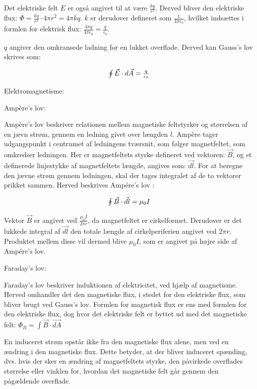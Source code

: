 Det elektriske felt $E$ er også angivet til at være $\frac{kq}{r^2}$. Derved bliver den elektriske flux: $\Phi = \frac{kq}{r^2} \cdot 4 \pi r^2 = 4 \pi k q$. $k$ er derudover defineret som $\frac{1}{4 \pi \epsilon_0}$, hvilket indsættes i formlen for elektrisk flux: $\frac{4 \pi q}{4 \pi \epsilon_0} = \frac{q}{\epsilon_0}$.

$q$ angiver den omkransede ladning for en lukket overflade. Derved kan Gauss's lov skrives som\cite[Kap. 21]{fysikbog}:

\begin{equation} \label{gauss}
\centerline{$\oint \vec{E} \cdot d \vec{A} = \frac{q}{\epsilon_0}$} 
\end{equation}


Elektromagnetisme:

Ampère's lov:

Ampère's lov beskriver relationen mellem magnetiske feltstyrker og størrelsen af en jævn strøm, gennem en ledning givet over længden $l$. Ampère tager udgangspunkt i centrumet af ledningens tværsnit, som følger magnetfeltet, som omkredser ledningen. Her er magnetfeltets styrke defineret ved vektoren: $\vec{B}$, og et definerede linjestykke af magnetfeltets længde, angives som: $\vec{dl}$. For at beregne den jævne strøm gennem ledningen, skal der tages integralet af de to vektorer prikket sammen. Herved beskrives Ampére's lov \cite{fysikbog}:

\begin{equation} \label{ampere}
\centerline{$\oint \vec{B} \cdot \vec{dl} = \mu_0 I$}
\end{equation}

Vektor $\vec{B}$ er angivet ved $\frac{\mu_0 I}{2 \pi r}$, da magnetfeltet er cirkelformet. Derudover er det lukkede integral af $\vec{dl}$ den totale længde af cirkelperiferien angivet ved $2 \pi r$. Produktet mellem disse vil dermed blive $\mu_0 I$, som er angivet på højre side af Ampére's lov.

Faraday's lov:

Faraday's lov beskriver induktionen af elektricitet, ved hjælp af magnetisme. Herved omhandler det den magnetiske flux, i stedet for den elektriske flux, som bliver brugt ved Gauss's lov. Formlen for magnetisk flux er ens med formlen for den elektriske flux, dog hvor det elektriske felt er byttet ud med det magnetiske felt: $\Phi_B = \int \vec{B} \cdot \vec{dA}$

En induceret strøm opstår ikke fra den magnetiske flux alene, men ved en ændring i den magnetiske flux. Dette betyder, at der bliver induceret spænding, dvs. hvis der sker en ændring af magnetfeltets styrke, den påvirkede overflades størrelse eller vinklen for, hvordan det magnetiske felt går gennem den pågældende overflade.

